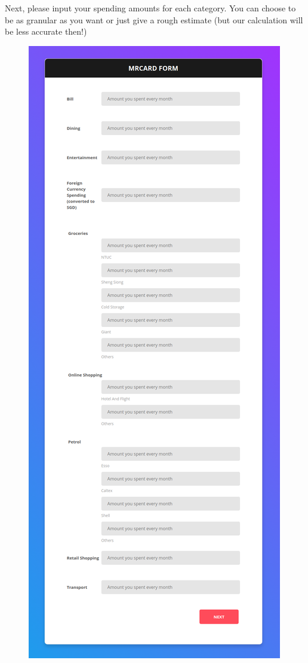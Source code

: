 		Next, please input your spending amounts for each category. You can choose to be as granular as you want or just give a rough estimate (but our calculation will be less accurate then!)

		\begin{figure}[H]
			\centering
			\includegraphics[scale=0.42]{img/spending_amount.png}
		\end{figure}

